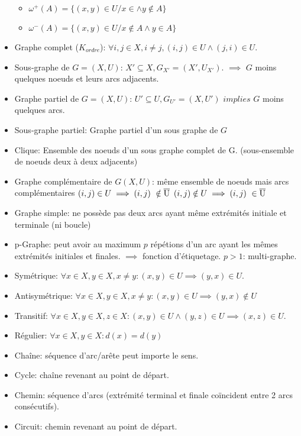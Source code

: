 \documentclass[10pt,landscape]{article}
\begin{document}
\begin{multicols}{3}
\begin{itemize}
          \begin{itemize}
            \item $\omega^{+}(A) = \{ (x, y) \in U / x \in \land y \notin A \}$
            \item $\omega^{-}(A) = \{ (x, y)\in U / x \notin A \land y \in A \}$
          \end{itemize}
      \item Graphe complet ($K_{ordre}$): $\forall i, j \in X, i \ne j, (i, j) \in U \land (j, i) \in U$.
      \item Sous-graphe de $G = (X, U)$: $X'\subseteq X, G_{X'} = (X', U_{X'})$.
        $\implies$ $G$ moins quelques noeuds et leurs arcs adjacents.
      \item Graphe partiel de $G = (X, U)$: $U'\subseteq U, G_{U'} = (X, U')$
        $implies$ $G$ moins quelques arcs.
      \item Sous-graphe partiel: Graphe partiel d'un sous graphe de $G$
      \item Clique: Ensemble des noeuds d'un sous graphe complet de G. (sous-ensemble de noeuds deux à deux adjacents)
      \item Graphe complémentaire de $G(X, U)$: même ensemble de noeuds mais arcs complémentaires
        $(i, j) \in U \implies (i, j) \notin \overline{\rm U}$
        $(i, j) \notin U \implies (i, j) \in \overline{\rm U}$
      \item Graphe simple: ne possède pas deux arcs ayant même extrémités initiale et terminale (ni boucle)
      \item p-Graphe: peut avoir au maximum $p$ répétions d'un arc ayant les mêmes extrémités initiales et finales. $\implies$ fonction d'étiquetage. $p > 1$: multi-graphe.
      \item Symétrique: $\forall x \in X, y \in X, x \ne y: (x, y) \in U \implies (y, x) \in U$.
      \item Antisymétrique: $\forall x \in X, y \in X, x \ne y: (x, y) \in U \implies (y, x) \notin U$
      \item Transitif: $\forall x \in X, y \in X, z \in X: (x, y) \in U \land (y, z) \in U \implies (x, z) \in U$.
      \item Régulier: $\forall x \in X, y \in X: d(x) = d(y)$
      \item Chaîne: séquence d'arc/arête peut importe le sens.
      \item Cycle: chaîne revenant au point de départ.
      \item Chemin: séquence d'arcs (extrémité terminal et finale coïncident entre 2 arcs consécutifs).
      \item Circuit: chemin revenant au point de départ.
    \end{itemize}

\end{multicols}
\end{document}
